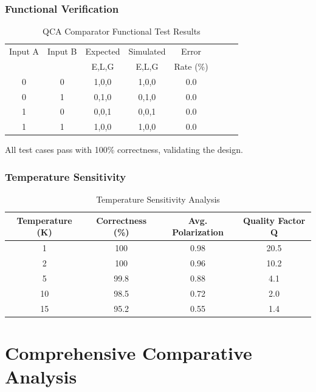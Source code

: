 \documentclass[12pt,a4paper,twoside]{report}
\begin{document}
\subsection{Functional Verification}

\begin{table}[H]
\centering
\caption{QCA Comparator Functional Test Results}
\label{tab:qca_verification}
\begin{tabularx}{\textwidth}{cccccccc}
\toprule
Input A & Input B & Expected & Simulated & Error \\
 & & E,L,G & E,L,G & Rate (\%) \\
\midrule
0 & 0 & 1,0,0 & 1,0,0 & 0.0 \\
0 & 1 & 0,1,0 & 0,1,0 & 0.0 \\
1 & 0 & 0,0,1 & 0,0,1 & 0.0 \\
1 & 1 & 1,0,0 & 1,0,0 & 0.0 \\
\bottomrule
\end{tabularx}
\end{table}

All test cases pass with 100\% correctness, validating the design.

\subsection{Temperature Sensitivity}

\begin{table}[H]
\centering
\caption{Temperature Sensitivity Analysis}
\label{tab:qca_temperature}
\begin{tabularx}{\textwidth}{cccc}
\toprule
Temperature (K) & Correctness (\%) & Avg. Polarization & Quality Factor Q \\
\midrule
1 & 100 & 0.98 & 20.5 \\
2 & 100 & 0.96 & 10.2 \\
5 & 99.8 & 0.88 & 4.1 \\
10 & 98.5 & 0.72 & 2.0 \\
15 & 95.2 & 0.55 & 1.4 \\
\bottomrule
\end{tabularx}
\end{table}

\chapter{Comprehensive Comparative Analysis}
\label{ch:comparative}
\end{document}
